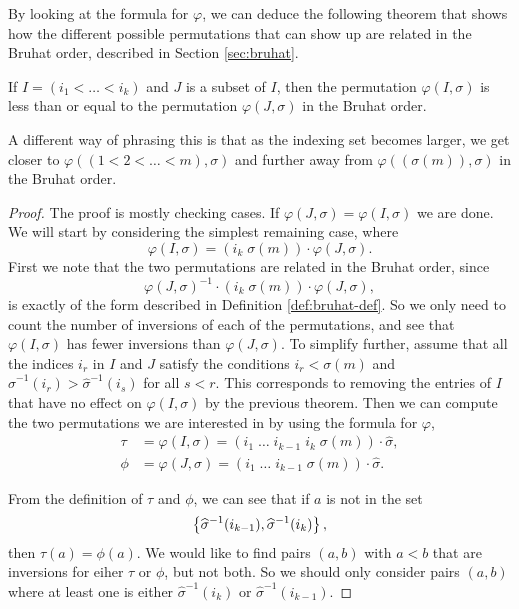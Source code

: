 By looking at the formula for $\varphi$, we can deduce the following
theorem that shows how the different possible permutations that can
show up are related in the Bruhat order, described in Section
\ref{sec:bruhat}.

\begin{theorem}
  \label{thm:bruhat-ord}
  If $I = (i_1 < \dots < i_k)$ and $J$ is a subset of $I$, then the
  permutation $\varphi(I,\sigma)$ is less than or equal to the
  permutation $\varphi(J,\sigma)$ in the Bruhat order.
\end{theorem}
A different way of phrasing this is that as the indexing set becomes
larger, we get closer to $\varphi\left((1 < 2 < \dots <
  m),\sigma\right)$ and further away from
$\varphi\left((\sigma(m)),\sigma\right)$ in the Bruhat order.
\begin{proof}
  The proof is mostly checking cases. If $\varphi(J,\sigma) =
  \varphi(I,\sigma)$ we are done. We will start by considering the
  simplest remaining case, where
  \[ \varphi(I,\sigma) = (i_k \; \sigma(m)) \cdot 
  \varphi(J,\sigma). \]
  First we note that the two permutations are related in the Bruhat
  order, since
  \[ \varphi(J,\sigma)^{-1} \cdot
  (i_k\;\sigma(m)) \cdot \varphi(J,\sigma), \]
  is exactly of the form described in Definition
  \ref{def:bruhat-def}. So
  we only need to count the number of inversions of each of the
  permutations, and
  see that $\varphi(I,\sigma)$ has fewer inversions than
  $\varphi(J,\sigma)$.
  To simplify further, assume that all the indices $i_r$ in $I$ and
  $J$ satisfy the conditions $i_r < \sigma(m)$ and
  $\widehat{\sigma}^{-1}(i_r) > \widehat{\sigma}^{-1}(i_s)$ for all $s
  < r$. This corresponds to removing the entries of $I$ that have no
  effect on $\varphi(I,\sigma)$ by the previous theorem. Then we can
  compute the two permutations we are interested in by using the
  formula for $\varphi$,
  \begin{align*}
    \tau &= \varphi(I,\sigma) = (i_1\;\dots\;i_{k-1}\;i_k\;\sigma(m))
           \cdot \widehat{\sigma}, \\
    \phi &= \varphi(J,\sigma) = (i_1\;\dots\;i_{k-1}\;\sigma(m)) \cdot
    \widehat{\sigma}.
  \end{align*}

  From the
  definition of $\tau$ and $\phi$, we can see that if $a$ is not in
  the set
  \[
  \left\{ \widehat{\sigma}^{-1}(i_{k-1}),\widehat{\sigma}^{-1}(i_{k}) \right\},
  \]
  then $\tau(a) = \phi(a)$. We would like to find pairs $(a,b)$
  with $a < b$ that are inversions for eiher $\tau$ or $\phi$, but not
  both. So we should only consider pairs $(a,b)$ where at least one is
  either $\widehat{\sigma}^{-1}(i_k)$ or
  $\widehat{\sigma}^{-1}(i_{k-1})$.


\end{proof}
